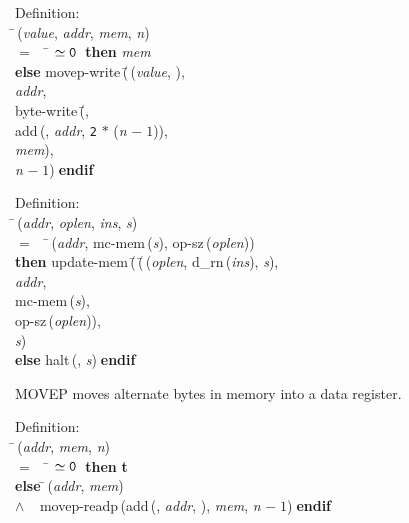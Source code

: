 \begin{tabbing}{\sc Definition}: \\  
\=\,({\it{value\/}}, {\it{addr\/}}, {\it{mem\/}}, {\it{n\/}}) \\ 
$=$$\;\;\;\;$\= $\simeq {\tt{0}}$$\;\;${\bf then }{\it{mem\/}} \\ 
{\bf else }{\rm{movep-write}}\,(\=\,({\it{value\/}}, {}), \\ 
{\it{addr\/}}, \\ 
{\rm{byte-write}}\,(\=, \\ 
{\rm{add}}\,({}, {\it{addr\/}}, {\tt{2}} $*$ ({\it{n\/}} $-\;1$)), \\ 
{\it{mem\/}})\-, \\ 
{\it{n\/}} $-\;1$)\-$\;${\bf  endif}\-\-
\end{tabbing}

\begin{tabbing}{\sc Definition}: \\  
\=\,({\it{addr\/}}, {\it{oplen\/}}, {\it{ins\/}}, {\it{s\/}}) \\ 
$=$$\;\;\;\;$\=\,({\it{addr\/}}, {\rm{mc-mem}}\,({\it{s\/}}), {\rm{op-sz}}\,({\it{oplen\/}})) \\ 
{\bf then }{\rm{update-mem}}\,(\=\,(\=\,({\it{oplen\/}}, {\rm{d\_rn}}\,({\it{ins\/}}), {\it{s\/}}), \\ 
{\it{addr\/}}, \\ 
{\rm{mc-mem}}\,({\it{s\/}}), \\ 
{\rm{op-sz}}\,({\it{oplen\/}}))\-, \\ 
{\it{s\/}})\- \\ 
{\bf else }{\rm{halt}}\,({}, {\it{s\/}})$\;${\bf  endif}\-\-
\end{tabbing}

 MOVEP moves alternate bytes in memory into a data register.
\begin{tabbing}{\sc Definition}: \\  
\=\,({\it{addr\/}}, {\it{mem\/}}, {\it{n\/}}) \\ 
$=$$\;\;\;\;$\= $\simeq {\tt{0}}$$\;\;${\bf then }{\bf{t}} \\ 
{\bf else }\=\,({\it{addr\/}}, {\it{mem\/}}) \\ 
$\wedge$$\;\;\;\;${\rm{movep-readp}}\,({\rm{add}}\,({}, {\it{addr\/}}, {}), {\it{mem\/}}, {\it{n\/}} $-\;1$)\-$\;${\bf  endif}\-\-
\end{tabbing}

